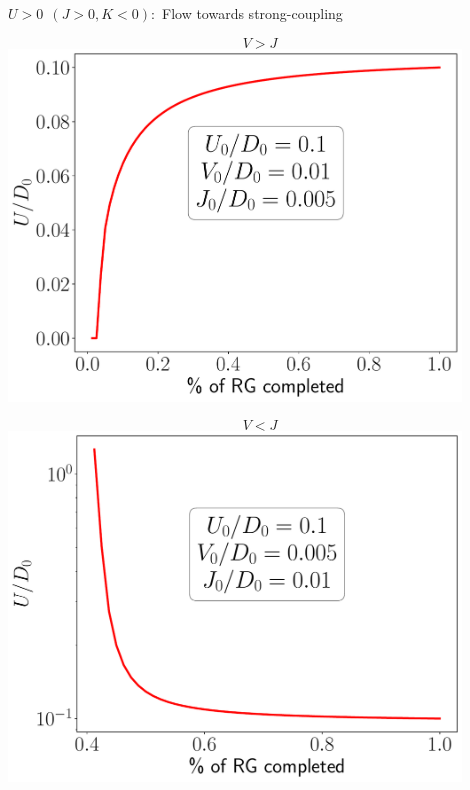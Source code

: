 \documentclass[aspectratio=169]{beamer}
\begin{document}
\begin{frame}[noframenumbering]{\(U>0~ ~ (J > 0, K < 0):\) Flow towards strong-coupling}
{\vspace*{-25pt}
\begin{minipage}{0.49\textwidth}
\centering
\[ V > J\]
	\includegraphics[width=0.9\textwidth]{figures/U_irr,U>0,U.pdf}
\end{minipage}
\begin{minipage}{0.49\textwidth}
\centering
\[ V < J\]
	\includegraphics[width=0.9\textwidth]{figures/U_rel,U>0,U.pdf}
\end{minipage}
}

\end{frame}
\end{document}
